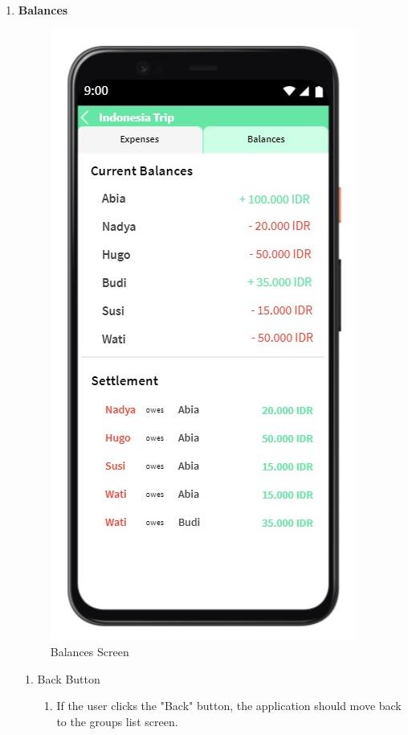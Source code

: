 \documentclass[conference]{IEEEtran}
\begin{document}
\begin{enumerate}
\begin{enumerate}
\begin{enumerate}
                    \end{enumerate}
            \end{enumerate}
        \item \textbf{Balances}
            \begin{figure}[htbp]
                \centerline{\includegraphics[scale=0.5]{img/ui/balances.jpg}}
                \caption{Balances Screen}
                \label{fig:balances-screen}
            \end{figure}
            \begin{enumerate}
                \item Back Button
                    \begin{enumerate}
                        \item If the user clicks the "Back" button, the application should move back to the groups list screen.

\end{enumerate}
\end{enumerate}
\end{enumerate}
\end{document}
